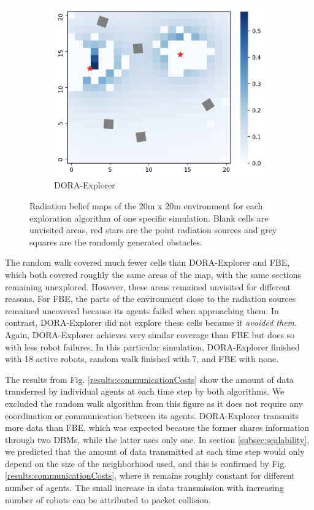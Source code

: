 \begin{figure}[h]
    \begin{subfigure}{0.49\textwidth}
        \includegraphics[width=\textwidth]{images/heatmap_dora.png}
        \caption{DORA-Explorer}
        \label{results:beliefdora}
    \end{subfigure}
    \caption{Radiation belief maps of the 20m x 20m environment for each exploration algorithm of one specific simulation. Blank cells are unvisited areas, red stars are the point radiation sources and grey squares are the randomly generated obstacles.}
    \label{results:belief}
\end{figure}

The random walk covered much fewer cells than DORA-Explorer and FBE, which both covered
roughly the same areas of the map, with the same sections remaining
unexplored. However, these areas remained unvisited for different
reasons. For FBE, the parts of the environment close to the radiation
sources remained uncovered because its agents failed when approaching
them. In contrast, DORA-Explorer did not explore these cells because it
\textit{avoided them}. Again, DORA-Explorer achieves very similar coverage than
FBE but does so with less robot failures. In this particular
simulation, DORA-Explorer finished with 18 active robots, random walk finished
with 7, and FBE with none. 


The results from Fig. \ref{results:communicationCosts} show the amount
of data transferred by individual agents at each time step by both
algorithms. We excluded the random walk algorithm from this figure as
it does not require any coordination or communication between its
agents. DORA-Explorer transmits more data than FBE, which was expected because
the former shares information through two DBMs, while the latter uses
only one. In section \ref{subsec:scalability}, we predicted that the
amount of data transmitted at each time step would only depend on the
size of the neighborhood used, and this is confirmed by
Fig. \ref{results:communicationCosts}, where it remains roughly
constant for different number of agents. The small increase in data
transmission with increasing number of robots can be attributed to
packet collision. 


